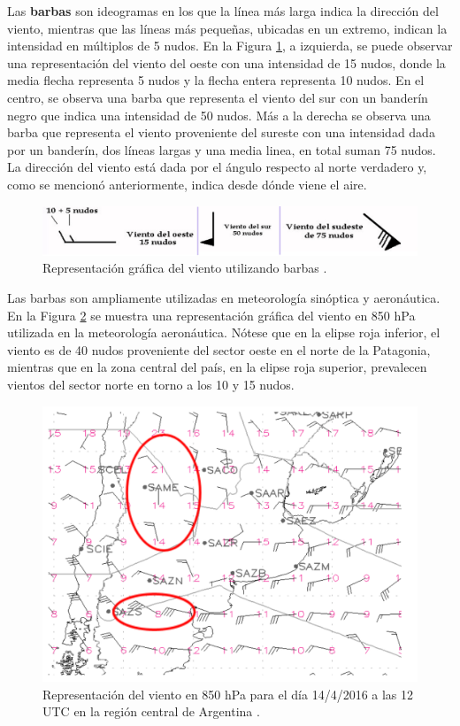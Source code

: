 Las \textbf{barbas} \cite{CursoDeObsevadores} son ideogramas en los que la línea más larga indica la dirección del viento, mientras que las líneas más pequeñas, ubicadas en un extremo, indican la intensidad en múltiplos de 5 nudos. En la Figura \ref{fig:barbas1}, a izquierda, se puede observar una representación del viento del oeste con una intensidad de 15 nudos, donde la media flecha representa 5 nudos y la flecha entera representa 10 nudos. En el centro, se observa una barba que representa el viento del sur con un banderín negro que indica una intensidad de 50 nudos. Más a la derecha se observa una barba que representa el viento proveniente del sureste con una intensidad dada por un banderín, dos líneas largas y una media linea, en total suman 75 nudos. La dirección del viento está dada por el ángulo respecto al norte verdadero y, como se mencionó anteriormente, indica desde dónde viene el aire.

\begin{figure}[H]
    \centering
    \includegraphics[width=1\linewidth]{Figuras/viento/barbas.png}
    \caption{Representación gráfica del viento utilizando barbas \cite{cursoObservadores2024}.}
    \label{fig:barbas1}
\end{figure}

Las barbas son ampliamente utilizadas en meteorología sinóptica y aeronáutica. En la Figura \ref{fig:mapaBarbas} se muestra una representación gráfica del viento en 850 \unit{\hecto\pascal} utilizada en la meteorología aeronáutica. Nótese que en la elipse roja inferior, el viento es de 40 nudos proveniente del sector oeste en el norte de la Patagonia, mientras que en la zona central del país, en la elipse roja superior, prevalecen vientos del sector norte en torno a los 10 y 15 nudos.


\begin{figure}[H]
    \centering
    \includegraphics[width=0.85\linewidth]{Figuras/viento/mapaBarbas.png}
    \caption{Representación del viento en 850 \unit{\hecto\pascal} para el día 14/4/2016 a las 12 UTC en la región central de Argentina \cite{cursoObservadores2024}.}
    \label{fig:mapaBarbas}
\end{figure}

